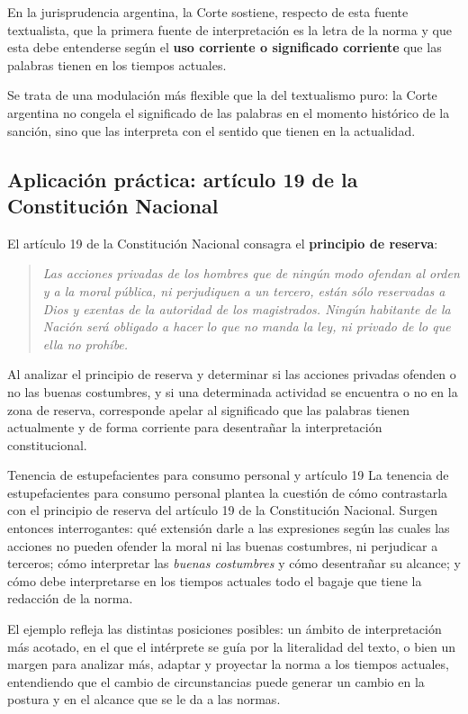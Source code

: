 \documentclass[12pt,oneside]{book}
\begin{document}
En la jurisprudencia argentina, la Corte sostiene, respecto de esta fuente textualista, que la primera fuente de interpretación es la letra de la norma y que esta debe entenderse según el \textbf{uso corriente o significado corriente} que las palabras tienen en los tiempos actuales.

Se trata de una modulación más flexible que la del textualismo puro: la Corte argentina no congela el significado de las palabras en el momento histórico de la sanción, sino que las interpreta con el sentido que tienen en la actualidad.

\subsection{Aplicación práctica: artículo 19 de la Constitución Nacional}

El artículo 19 de la Constitución Nacional consagra el \textbf{principio de reserva}:

\begin{quote}
\textit{Las acciones privadas de los hombres que de ningún modo ofendan al orden y a la moral pública, ni perjudiquen a un tercero, están sólo reservadas a Dios y exentas de la autoridad de los magistrados. Ningún habitante de la Nación será obligado a hacer lo que no manda la ley, ni privado de lo que ella no prohíbe.}
\end{quote}

Al analizar el principio de reserva y determinar si las acciones privadas ofenden o no las buenas costumbres, y si una determinada actividad se encuentra o no en la zona de reserva, corresponde apelar al significado que las palabras tienen actualmente y de forma corriente para desentrañar la interpretación constitucional.

\begin{example}{Tenencia de estupefacientes para consumo personal y artículo 19}
La tenencia de estupefacientes para consumo personal plantea la cuestión de cómo contrastarla con el principio de reserva del artículo 19 de la Constitución Nacional. Surgen entonces interrogantes: qué extensión darle a las expresiones según las cuales las acciones no pueden ofender la moral ni las buenas costumbres, ni perjudicar a terceros; cómo interpretar las \textit{buenas costumbres} y cómo desentrañar su alcance; y cómo debe interpretarse en los tiempos actuales todo el bagaje que tiene la redacción de la norma.

El ejemplo refleja las distintas posiciones posibles: un ámbito de interpretación más acotado, en el que el intérprete se guía por la literalidad del texto, o bien un margen para analizar más, adaptar y proyectar la norma a los tiempos actuales, entendiendo que el cambio de circunstancias puede generar un cambio en la postura y en el alcance que se le da a las normas.
\end{example}
\end{document}
